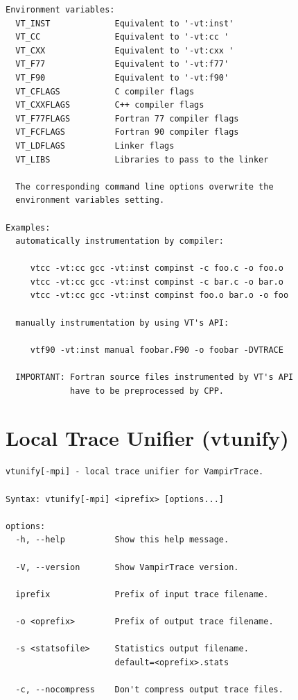 \documentclass[a4paper,twoside,12pt,BCOR12mm]{scrbook}
\begin{document}
\begin{latexonly}
\begin{verbatim}
Environment variables:
  VT_INST             Equivalent to '-vt:inst'
  VT_CC               Equivalent to '-vt:cc '
  VT_CXX              Equivalent to '-vt:cxx '
  VT_F77              Equivalent to '-vt:f77'
  VT_F90              Equivalent to '-vt:f90'
  VT_CFLAGS           C compiler flags
  VT_CXXFLAGS         C++ compiler flags
  VT_F77FLAGS         Fortran 77 compiler flags
  VT_FCFLAGS          Fortran 90 compiler flags
  VT_LDFLAGS          Linker flags
  VT_LIBS             Libraries to pass to the linker

  The corresponding command line options overwrite the 
  environment variables setting.

Examples:
  automatically instrumentation by compiler:

     vtcc -vt:cc gcc -vt:inst compinst -c foo.c -o foo.o
     vtcc -vt:cc gcc -vt:inst compinst -c bar.c -o bar.o
     vtcc -vt:cc gcc -vt:inst compinst foo.o bar.o -o foo

  manually instrumentation by using VT's API:

     vtf90 -vt:inst manual foobar.F90 -o foobar -DVTRACE

  IMPORTANT: Fortran source files instrumented by VT's API
             have to be preprocessed by CPP.
\end{verbatim}
\latex{\end{small}}


\section{Local Trace Unifier (vtunify)}
\label{sec:VTUNIFY}

\latex{\begin{small}}
\begin{verbatim}
vtunify[-mpi] - local trace unifier for VampirTrace.

Syntax: vtunify[-mpi] <iprefix> [options...]

options:
  -h, --help          Show this help message.

  -V, --version       Show VampirTrace version.

  iprefix             Prefix of input trace filename.

  -o <oprefix>        Prefix of output trace filename.

  -s <statsofile>     Statistics output filename.
                      default=<oprefix>.stats

  -c, --nocompress    Don't compress output trace files.


\end{verbatim}
\end{latexonly}
\end{document}
